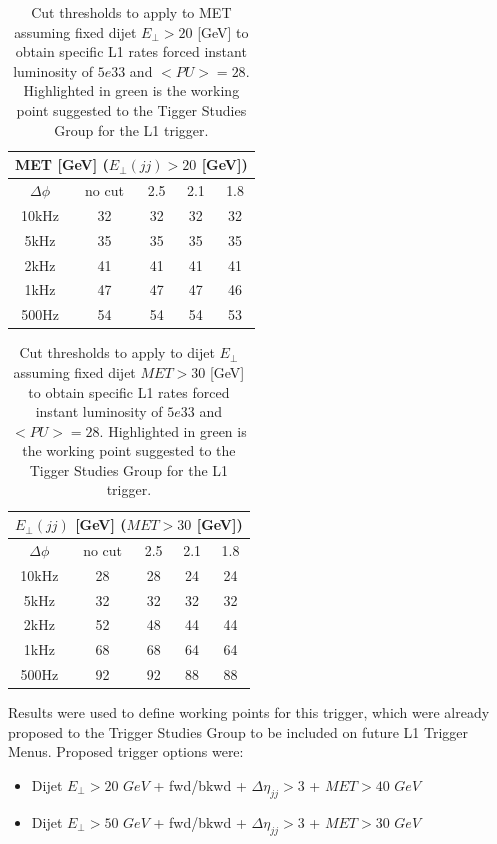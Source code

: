 \documentclass[%
reprint,
amsmath,
amssymb,
aps,
pra,
showkeys
]{revtex4-1}
\begin{document}
\begin{table}
\begin{tabular}{|c||c|c|c|c|}
\hline
\multicolumn{5}{|c|}{MET [GeV] ($E_\bot(jj)>20$ [GeV])} \\
\hline
$\Delta\phi$ & no cut & 2.5 & 2.1 & 1.8 \\
\hline
10kHz        &     32 &  32 &  32 &  32 \\
5kHz         &     35 &  35 &  35 &  35 \\
\cellcolor{green}2kHz &\cellcolor{green}      41 &  41 &  41 &  41 \\
1kHz         &     47 &  47 &  47 &  46 \\
500Hz        &     54 &  54 &  54 &  53 \\
\hline
\end{tabular}
\caption{Cut thresholds to apply to MET assuming fixed dijet $E_\bot>20$ [GeV] to obtain specific L1 rates forced
instant luminosity of $5e33$ and $<PU>=28$. Highlighted in green is the working point suggested to the Tigger
Studies Group for the L1 trigger.}
\label{table_5E33_PU28_fixedDijet}
\end{table}

\begin{table}
\begin{tabular}{|c||c|c|c|c|}
\hline
\multicolumn{5}{|c|}{$E_\bot(jj)$ [GeV] ($MET>30$ [GeV])} \\
\hline
$\Delta\phi$ & no cut & 2.5 & 2.1 & 1.8 \\
\hline
10kHz        &     28 &  28 &  24 &  24 \\
5kHz         &     32 &  32 &  32 &  32 \\
\cellcolor{green} 2kHz         &\cellcolor{green}      52 &  48 &  44 &  44 \\
1kHz         &     68 &  68 &  64 &  64 \\
500Hz        &     92 &  92 &  88 &  88 \\
\hline
\end{tabular}
\caption{Cut thresholds to apply to dijet $E_\bot$ assuming fixed dijet $MET>30$ [GeV] to obtain specific L1 rates 
forced instant luminosity of $5e33$ and $<PU>=28$. Highlighted in green is the working point suggested to the Tigger
Studies Group for the L1 trigger.}
\label{table_5E33_PU28_fixedMET}
\end{table}

Results were used to define working points for this trigger, which were already proposed to the Trigger Studies Group
to be included on future L1 Trigger Menus. Proposed trigger options were:
\begin{itemize}
\item Dijet $E_\bot>20$ $GeV$ + fwd/bkwd + $\Delta\eta_{jj}>3$ + $MET>40$ $GeV$
\item Dijet $E_\bot>50$ $GeV$ + fwd/bkwd + $\Delta\eta_{jj}>3$ + $MET>30$ $GeV$
\end{itemize}
\end{document}
